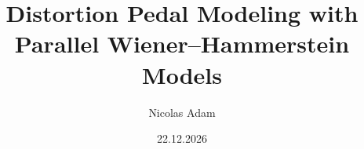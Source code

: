 \documentclass[]{iisreport}
\title{Distortion Pedal Modeling with Parallel Wiener–Hammerstein Models}
\author{Nicolas Adam}
\date{22.12.2026}
\begin{document}
\frontmatter





\tableofcontents

\mainmatter








\appendix



\backmatter


\listofacronyms

\listoffigures
\listoftables


\end{document}
